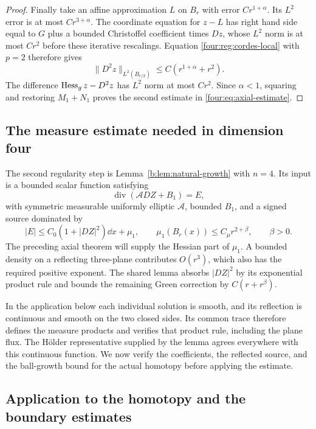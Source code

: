 \begin{proof}
Finally take an affine approximation $L$ on $B_r$ with error
$Cr^{1+\alpha}$.  Its $L^2$ error is at most $Cr^{3+\alpha}$.
The coordinate equation for $z-L$ has right hand side equal to
$G$ plus a bounded Christoffel coefficient times $Dz$, whose
$L^2$ norm is at most $Cr^2$ before these iterative rescalings.
Equation \eqref{four:reg:cordes-local} with $p=2$ therefore gives
\[
 \|D^2z\|_{L^2(B_{r/2})}\le C(r^{1+\alpha}+r^2).
\]
The difference $\operatorname{Hess}_gz-D^2z$ has $L^2$ norm at most $Cr^2$.
Since $\alpha<1$, squaring and restoring $M_1+N_1$ proves the
second estimate in \eqref{four:eq:axial-estimate}.
\end{proof}

\subsection{The measure estimate needed in dimension four}

The second regularity step is Lemma~\ref{b:lem:natural-growth} with
$n=4$. Its input is a bounded scalar function satisfying
\begin{equation}\label{four:reg:natural-equation}
 \operatorname{div}(\mathcal A DZ+B_1)=E,
\end{equation}
with symmetric measurable uniformly elliptic $\mathcal A$, bounded
$B_1$, and a signed source dominated by
\begin{equation}\label{four:reg:natural-growth-bound}
 |E|\le C_0(1+|DZ|^2)\dd x+\mu_1,\qquad
 \mu_1(B_r(x))\le C_\mu r^{2+\beta},\qquad \beta>0.
\end{equation}
The preceding axial theorem will supply the Hessian part of $\mu_1$.
A bounded density on a reflecting three-plane contributes $O(r^3)$,
which also has the required positive exponent. The shared lemma
absorbs $|DZ|^2$ by its exponential product rule and bounds the
remaining Green correction by $C(r+r^\beta)$.

In the application below each individual solution is smooth, and its
reflection is continuous and smooth on the two closed sides. Its common
trace therefore defines the measure products and verifies that product
rule, including the plane flux. The H\"older representative supplied
by the lemma agrees everywhere with this continuous function.
We now verify the coefficients, the reflected source, and the ball-growth
bound for the actual homotopy before applying the estimate.

\subsection{Application to the homotopy and the boundary estimates}

